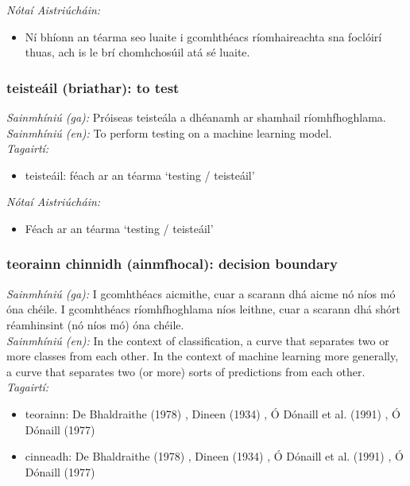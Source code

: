  \noindent \textit{Nótaí Aistriúcháin:}
\begin{itemize}
	\item Ní bhíonn an téarma seo luaite i gcomhthéacs ríomhaireachta sna foclóirí thuas, ach is le brí chomhchosúil atá sé luaite.
\end{itemize}


\subsubsection*{teisteáil (briathar): to test}
 \noindent \textit{Sainmhíniú (ga):} Próiseas teisteála a dhéanamh ar shamhail ríomhfhoghlama.
\\
 \noindent \textit{Sainmhíniú (en):} To perform testing on a machine learning model.
\\
 \noindent \textit{Tagairtí:}
\begin{itemize}
	\item teisteáil: féach ar an téarma `testing / teisteáil'
\end{itemize}

 \noindent \textit{Nótaí Aistriúcháin:}
\begin{itemize}
	\item Féach ar an téarma `testing / teisteáil'
\end{itemize}


\subsubsection*{teorainn chinnidh (ainmfhocal): decision boundary}
 \noindent \textit{Sainmhíniú (ga):} I gcomhthéacs aicmithe, cuar a scarann dhá aicme nó níos mó óna chéile. I gcomhthéacs ríomhfhoghlama níos leithne, cuar a scarann dhá shórt réamhinsint (nó níos mó) óna chéile.
\\
 \noindent \textit{Sainmhíniú (en):} In the context of classification, a curve that separates two or more classes from each other. In the context of machine learning more generally, a curve that separates two (or more) sorts of predictions from each other.
\\
 \noindent \textit{Tagairtí:}
\begin{itemize}
	\item teorainn: De Bhaldraithe (1978) \cite{de-bhaldraithe}, Dineen (1934) \cite{dineen}, Ó Dónaill et al. (1991) \cite{focloir-beag}, Ó Dónaill (1977) \cite{odonaill}
	\item cinneadh: De Bhaldraithe (1978) \cite{de-bhaldraithe}, Dineen (1934) \cite{dineen}, Ó Dónaill et al. (1991) \cite{focloir-beag}, Ó Dónaill (1977) \cite{odonaill}
\end{itemize}

